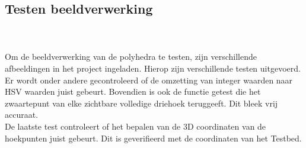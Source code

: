 \subsection{Testen beeldverwerking}
\\\\
Om de beeldverwerking van de polyhedra te testen, zijn verschillende afbeeldingen in het project ingeladen. Hierop zijn verschillende testen uitgevoerd. Er wordt onder andere gecontroleerd of de omzetting van integer waarden naar HSV waarden juist gebeurt. Bovendien is ook de functie getest die het zwaartepunt van elke zichtbare volledige driehoek teruggeeft. Dit bleek vrij accuraat.
\\
De laatste test controleert of het bepalen van de 3D coordinaten van de hoekpunten juist gebeurt. Dit is geverifieerd met de coordinaten van het Testbed.